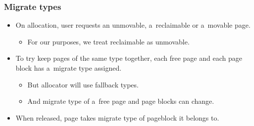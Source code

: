 \begin{frame}[fragile]
  \frametitle{Migrate types}

  \begin{itemize}
  \item On allocation, user requests an unmovable, a~reclaimable or
    a~movable page.
    \begin{itemize}
    \item For our purposes, we treat reclaimable as unmovable.
    \end{itemize}
  \item To try keep pages of the same type together, each free page
    and each page block has a~migrate type assigned.
    \begin{itemize}
    \item But allocator will use fallback types.
    \item And migrate type of a~free page and page blocks can change.
    \end{itemize}
  \item When released, page takes migrate type of pageblock it belongs
    to.
  \end{itemize}
\end{frame}
